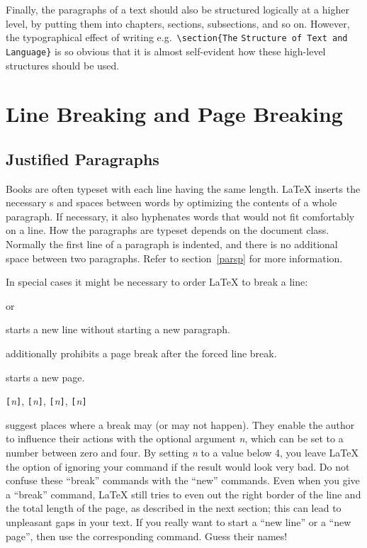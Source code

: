 Finally, the paragraphs of a text should also be structured logically
at a higher level, by putting them into chapters, sections,
subsections, and so on.  However, the typographical effect of writing
e.g.\ \verb|\section{The| \texttt{Structure of Text and Language}\verb|}| is
so obvious that it is almost self-evident how these high-level
structures should be used.

\section{Line Breaking and Page Breaking}
 
\subsection{Justified Paragraphs}

Books are often typeset with each line having the same length.
\LaTeX{} inserts the necessary s and spaces between words
by optimizing the contents of a whole paragraph. If necessary, it
also hyphenates words that would not fit comfortably on a line.
How the paragraphs are typeset depends on the document class.
Normally the first line of a paragraph is indented, and there is no
additional space between two paragraphs. Refer to section~\ref{parsp}
for more information.

In special cases it might be necessary to order \LaTeX{} to break a
line: 
\begin{lscommand}
\ci{\bs} or  
\end{lscommand}
\noindent starts a new line without starting a new paragraph. 

\begin{lscommand}
\ci{\bs*}
\end{lscommand}
\noindent additionally prohibits a page break after the forced
line break. 

\begin{lscommand}
\end{lscommand}
\noindent starts a new page. 

\begin{lscommand}
\verb|[|\emph{n}\verb|]|,
\verb|[|\emph{n}\verb|]|, 
\verb|[|\emph{n}\verb|]|,
\verb|[|\emph{n}\verb|]|
\end{lscommand}
\noindent suggest places where a break may (or may not happen). They enable the author to influence their
actions with the optional argument \emph{n}, which can be set to a number
between zero and four. By setting \emph{n} to a value below 4, you leave
\LaTeX{} the option of ignoring your command if the result would look very
bad. Do not confuse these ``break'' commands with the ``new'' commands. Even
when you give a ``break'' command, \LaTeX{} still tries to even out the
right border of the line and the total length of the page, as described in
the next section; this can lead to unpleasant gaps in your text.
If you really want to start a ``new line'' or a ``new page'', then use the
corresponding command. Guess their names!


